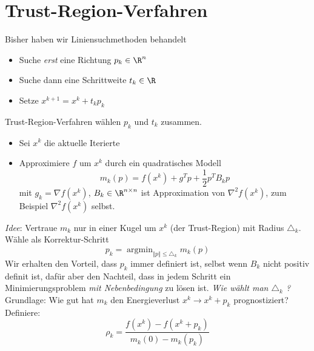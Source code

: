 \section{Trust-Region-Verfahren}
Bisher haben wir Liniensuchmethoden behandelt \begin{itemize}
	\item Suche \emph{erst} eine Richtung $p_k \in \R^n$
	\item Suche dann eine Schrittweite $t_k \in \R$
	\item Setze $x^{k+1}=x^k+t_kp_k$
\end{itemize}
Trust-Region-Verfahren wählen $p_k$ und $t_k$ zusammen. \begin{itemize}
	\item Sei $x^k$ die aktuelle Iterierte
	\item Approximiere $f$ um $x^k$ durch ein quadratisches Modell \begin{equation*}
			m_k(p)=f (x^k )+g^Tp+\frac{1}{2} p^TB_kp
		\end{equation*}
		mit $g_k=\nabla f (x^k )$, $B_k \in \R^{n \times n}$ ist Approximation von $\nabla^2 f (x^k )$, zum Beispiel $\nabla^2 f(x^k )$ selbst.
\end{itemize}
\emph{Idee}: Vertraue $m_k$ nur in einer Kugel um $x^k$ (der Trust-Region) mit Radius $\triangle_k$. \\ Wähle als Korrektur-Schritt \begin{equation*}
	p_k=\operatorname{argmin}_{\left\Vert p \right\Vert \leq \triangle_k} m_k(p)
\end{equation*}
Wir erhalten den Vorteil, dass $p_k$ immer definiert ist, selbst wenn $B_k$ nicht positiv definit ist, dafür aber den Nachteil, dass in jedem Schritt ein Minimierungsproblem \emph{mit Nebenbedingung} zu lösen ist. \emph{Wie wählt man $\triangle_k$ ?} Grundlage: Wie gut hat $m_k$ den Energieverlust $x^k \rightarrow x^k+p_k$ prognostiziert? Definiere: \begin{equation*}
	\rho_k=\frac{f (x^k )-f (x^k+p_k )}{m_k(0)-m_k (p_k )}
\end{equation*}

